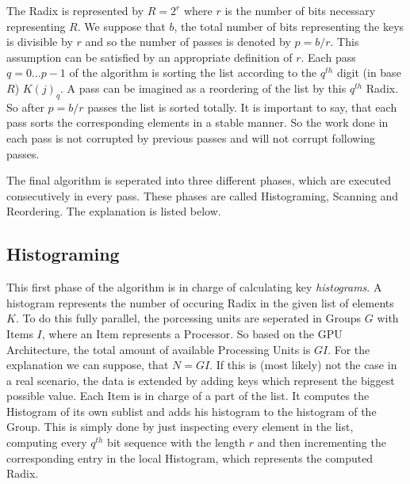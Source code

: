\documentclass{llncs}
\begin{document}
The Radix is represented by $R = 2^r$ where $r$ is the number of bits necessary representing $R$. We suppose that $b$, the total number of bits representing the keys is divisible by $r$ and so the number of passes is denoted by $p = b/r$. This assumption can be satisfied by an appropriate definition of $r$. Each pass $q=0 \dots p-1$ of the algorithm is sorting the list according to the $q^{th}$ digit (in base $R$) $K(j)_q$. A pass can be imagined as a reordering of the list by this $q^{th}$ Radix. So after $p = b/r$ passes the list is sorted totally. It is important to say, that each pass sorts the corresponding elements in a stable manner. So the work done in each pass is not corrupted by previous passes and will not corrupt following passes.

The final algorithm is seperated into three different phases, which are executed consecutively in every pass. These phases are called Histograming, Scanning and Reordering. The explanation is listed below.



\subsection{Histograming}
This first phase of the algorithm is in charge of calculating key \textit{histograms}. A histogram represents the number of occuring Radix in the given list of elements $K$. To do this fully parallel, the porcessing units are seperated in Groups $G$ with Items $I$, where an Item represents a Processor. So based on the GPU Architecture, the total amount of available Processing Units is $GI$. For the explanation we can suppose, that $N=GI$. If this is (most likely) not the case in a real scenario, the data is extended by adding keys which represent the biggest possible value. Each Item is in charge of a part of the list. It computes the Histogram of its own sublist and adds his histogram to the histogram of the Group. This is simply done by just inspecting every element in the list, computing every $q^{th}$ bit sequence with the length $r$ and then incrementing the corresponding entry in the local Histogram, which represents the computed Radix.

\end{document}
